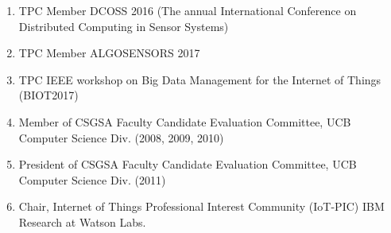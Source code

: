 \documentclass[12pt]{article}
\begin{document}
\begin{enumerate}
    \item TPC Member DCOSS 2016 (The annual International Conference on
    Distributed Computing in Sensor Systems)
    \item TPC Member ALGOSENSORS 2017 
    \item TPC IEEE workshop on Big Data Management for the Internet of Things (BIOT2017)
    \item Member of CSGSA Faculty Candidate Evaluation Committee, UCB Computer Science Div. (2008, 2009, 2010)
    \item President of CSGSA Faculty Candidate Evaluation Committee, UCB Computer Science Div. (2011)
    \item Chair, Internet of Things Professional Interest Community (IoT-PIC) IBM Research at Watson Labs.
\end{enumerate}
\end{document}
